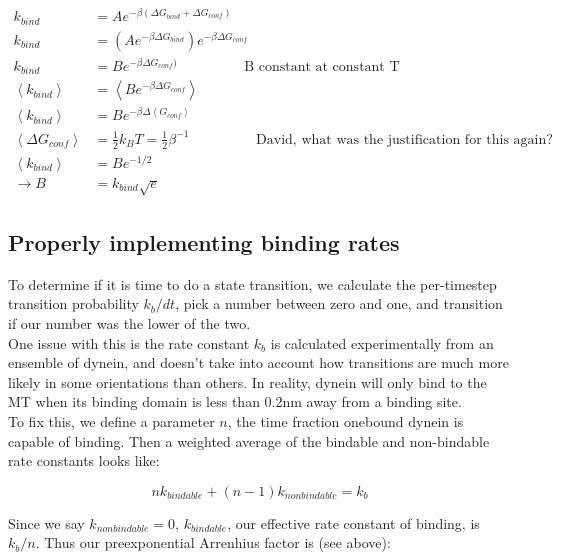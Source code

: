 \documentclass[10pt]{article} %
\begin{document}
\begin{align*}
  k_{bind} &= Ae^{-\beta(\Delta G_{bind} + \Delta G_{conf})}\\
  k_{bind} &= \left(Ae^{-\beta\Delta G_{bind}}\right)e^{-\beta\Delta G_{conf}}\\
  k_{bind} &= Be^{-\beta\Delta G_{conf})}\hspace{2cm}\mbox{B constant at constant T}\\
  \left<k_{bind}\right> &= \left<Be^{-\beta\Delta G_{conf}}\right>\\
  \left<k_{bind}\right> &= Be^{-\beta\Delta \left<G_{conf}\right>}\\
  \left<\Delta G_{conf}\right> &= \frac{1}{2}k_BT = \frac12\beta^{-1}\hspace{2cm}\mbox{David, what was the justification for this again?}\\
  \left<k_{bind}\right> &= Be^{-1/2}\\
  \rightarrow B &= k_{bind}\sqrt{e}
\end{align*}

\subsection{Properly implementing binding rates}
To determine if it is time to do a state transition, we calculate the per-timestep
transition probability $k_b/dt$, pick a number between zero and one, and transition
if our number was the lower of the two.\\

One issue with this is the rate constant $k_b$ is calculated experimentally from an
ensemble of dynein, and doesn't take into account how transitions are much more likely in some orientations than others. In reality, dynein will only bind to the MT when
its binding domain is less than 0.2nm away from a binding site.\\

To fix this, we define a parameter $n$, the time fraction onebound dynein is capable
of binding. Then a weighted average of the bindable and non-bindable rate constants
looks like:

\begin{equation*}
  nk_{bindable} + (n-1)k_{nonbindable} = k_b
\end{equation*}

Since we say $k_{nonbindable} = 0$, $k_{bindable}$, our effective rate constant of
binding, is $k_b/n$. Thus our preexponential Arrenhius factor is (see above):
\end{document}
